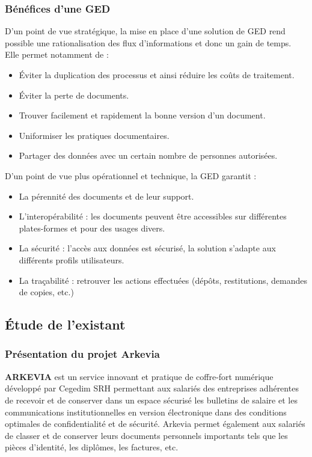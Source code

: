 \subsubsection{Bénéfices d'une GED}
D’un point de vue stratégique, la mise en place d’une solution de GED rend possible une rationalisation des flux d’informations et donc un gain de temps. Elle permet notamment de :    
\begin{itemize}
    \item Éviter la duplication des processus et ainsi réduire les coûts de traitement.
    \item Éviter la perte de documents.
    \item Trouver facilement et rapidement la bonne version d’un document.
    \item Uniformiser les pratiques documentaires.
    \item Partager des données avec un certain nombre de personnes autorisées.\\
\end{itemize}

D’un point de vue plus opérationnel et technique, la GED garantit : 
\begin{itemize}
    \item La pérennité des documents et de leur support.
    \item L'interopérabilité : les documents peuvent être accessibles sur différentes plates-formes et pour des usages divers.
    \item La sécurité : l’accès aux données est sécurisé, la solution s’adapte aux différents profils utilisateurs.
    \item La traçabilité : retrouver les actions effectuées (dépôts, restitutions, demandes de copies, etc.)
\end{itemize}
\subsection{Étude de l'existant}
\subsubsection{Présentation du projet Arkevia}
\textbf{ARKEVIA} est  un service  innovant  et  pratique de coffre-fort  numérique  développé  par  Cegedim  SRH permettant aux salariés des entreprises adhérentes de recevoir et de conserver dans un espace sécurisé les bulletins de salaire et les communications institutionnelles en version électronique dans des conditions optimales de confidentialité et de sécurité. Arkevia permet également aux salariés de classer et de conserver leurs documents personnels importants tels que les pièces d'identité, les diplômes, les factures, etc.\\

